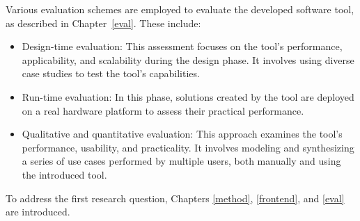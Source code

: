          Various evaluation schemes are employed to evaluate the developed software tool, as described in Chapter~\ref{eval}. These include:
         
         \begin{itemize}
             \item Design-time evaluation: This assessment focuses on the tool's performance, applicability, and scalability during the design phase. It involves using diverse case studies to test the tool's capabilities.
             
             \item Run-time evaluation: In this phase, solutions created by the tool are deployed on a real hardware platform to assess their practical performance.
             
             \item Qualitative and quantitative evaluation: This approach examines the tool's performance, usability, and practicality. It involves modeling and synthesizing a series of use cases performed by multiple users, both manually and using the introduced tool.
         
         \end{itemize}
         To address the first research question, Chapters \ref{method}, \ref{frontend}, and \ref{eval} are introduced.	    
	
	
	
	
